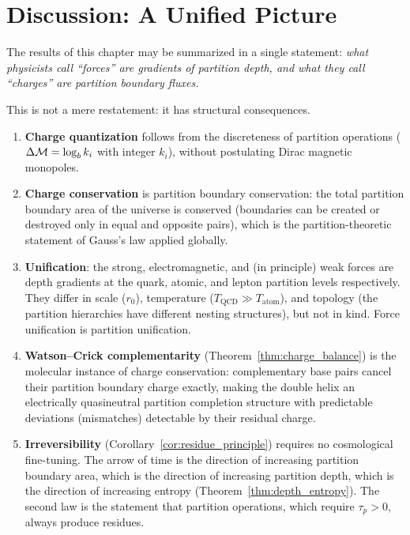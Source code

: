 \section{Discussion: A Unified Picture}
\label{sec:discussion_ch2}

The results of this chapter may be summarized in a single statement:
\emph{what physicists call ``forces'' are gradients of partition depth, and
what they call ``charges'' are partition boundary fluxes.}

This is not a mere restatement: it has structural consequences.

\begin{enumerate}[label=(\arabic*)]
  \item \textbf{Charge quantization} follows from the discreteness of partition
        operations ($\Delta\mathcal{M} = \log_b k_i$ with integer $k_i$), without
        postulating Dirac magnetic monopoles.

  \item \textbf{Charge conservation} is partition boundary conservation: the
        total partition boundary area of the universe is conserved (boundaries
        can be created or destroyed only in equal and opposite pairs), which
        is the partition-theoretic statement of Gauss's law applied globally.

  \item \textbf{Unification}: the strong, electromagnetic, and (in principle)
        weak forces are depth gradients at the quark, atomic, and lepton
        partition levels respectively. They differ in scale ($r_0$), temperature
        ($T_{\mathrm{QCD}} \gg T_{\mathrm{atom}}$), and topology (the
        partition hierarchies have different nesting structures), but not in
        kind. Force unification is partition unification.

  \item \textbf{Watson--Crick complementarity} (Theorem~\ref{thm:charge_balance})
        is the molecular instance of charge conservation: complementary base
        pairs cancel their partition boundary charge exactly, making the
        double helix an electrically quasineutral partition completion structure
        with predictable deviations (mismatches) detectable by their residual charge.

  \item \textbf{Irreversibility} (Corollary~\ref{cor:residue_principle}) requires
        no cosmological fine-tuning. The arrow of time is the direction of
        increasing partition boundary area, which is the direction of increasing
        partition depth, which is the direction of increasing entropy
        (Theorem~\ref{thm:depth_entropy}). The second law is the statement that
        partition operations, which require $\tau_p > 0$, always produce residues.
\end{enumerate}

